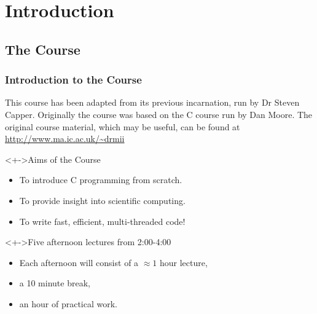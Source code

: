 \documentclass[smaller,table]{beamer} %
\subtitle{Lecture 1 of 5}
\begin{document}
{
\begin{frame}
  \titlepage
\end{frame}
}

\section{Introduction}
\subsection{The Course}

\begin{frame}
\frametitle{Introduction to the Course}
This course has been adapted from its previous incarnation, run by Dr Steven Capper.
Originally the course was based on the C course run by Dan Moore. The original course material, which may be useful, can be found at
\url{http://www.ma.ic.ac.uk/~drmii}
\begin{block}<+->{Aims of the Course}
\begin{itemize}
\item To introduce C programming from scratch.
\item To provide insight into scientific computing.
\item To write fast, efficient, multi-threaded code!
\end{itemize}
\end{block}

\begin{block}<+->{Five afternoon lectures from 2:00-4:00}
\begin{itemize}
\item Each afternoon will consist of a $\approx 1$ hour lecture,
\item a 10 minute break,
\item an hour of practical work.
\end{itemize}
\end{block}
\end{frame}
\end{document}

